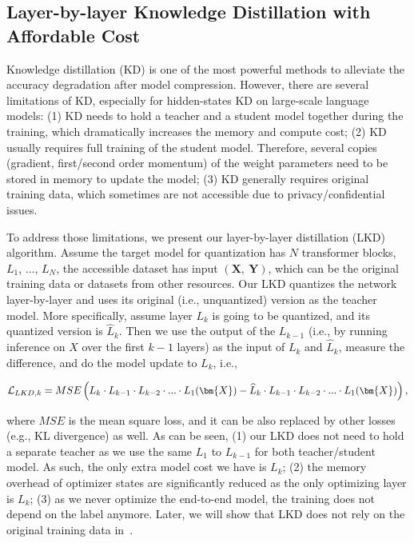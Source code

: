 \subsection{Layer-by-layer Knowledge Distillation with Affordable Cost}

Knowledge distillation (KD) is one of the most powerful methods to alleviate the accuracy degradation after model compression. However, there are several limitations of KD, especially for hidden-states KD on large-scale language models: (1) KD needs to hold a teacher and a student model together during the training, which dramatically increases the memory and compute cost; (2) KD usually requires full training of the student model. Therefore, several copies (gradient, first/second order momentum) of the weight parameters need to be stored in memory to update the model; (3) KD generally requires original training data, which sometimes are not accessible due to  privacy/confidential issues.

To address those limitations, we present our layer-by-layer distillation (LKD) algorithm. Assume the target model for quantization has $N$ transformer blocks, $L_1$, ..., $L_N$, the accessible dataset has input $({\bm{X}},~{\bm{Y}})$, which can be the original training data or datasets from other resources. Our LKD quantizes the network layer-by-layer and uses its original (i.e., unquantized) version as the teacher model. More specifically, assume layer $L_k$ is going to be quantized, and its quantized version is $\widehat L_k$. Then we use the output of the $L_{k-1}$ (i.e., by running inference on $X$ over the first $k-1$ layers) as the input of $L_k$ and $\widehat L_k$, measure the difference, and do the model update to $L_k$, i.e.,

\begin{equation}
\label{eq:lwd_loss}
\small
    \mathcal{L}_{LKD, k} = MSE\left(L_k \cdot L_{k-1} \cdot L_{k-2} \cdot ... \cdot L_{1} ({\bm{X}}) - \widehat L_k \cdot L_{k-1} \cdot L_{k-2} \cdot ... \cdot L_{1} ({\bm{X}})\right),
\end{equation}

where $MSE$ is the mean square loss, and it can be also replaced by other losses (e.g., KL divergence) as well. As can be seen, (1) our LKD does not need to hold a separate teacher as we use the same $L_1$ to $L_{k-1}$ for both teacher/student model. As such, the only extra model cost we have is $L_{k}$; (2) the memory overhead of optimizer states are significantly reduced as the only optimizing layer is $L_k$; (3) as we never optimize the end-to-end model, the training does not depend on the label anymore. Later, we will show that LKD does not rely on the original training data in~.

